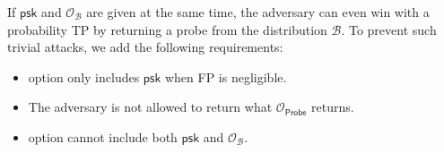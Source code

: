 \noindent If $\textsf{psk}$ and $\mathcal{O}_{\mathcal{B}}$ are given at the same time, the adversary can even win with a probability \textsf{TP} by returning a probe from the distribution $\mathcal{B}$. To prevent such trivial attacks, we add the following requirements:

\begin{itemize}
	\item \textsf{option} only includes $\textsf{psk}$ when \textsf{FP} is negligible.

	\item \label{item:requirement} The adversary is not allowed to return what $\mathcal{O}_\textsf{Probe}$ returns.
	
	\item \textsf{option} cannot include both $\textsf{psk}$ and $\mathcal{O}_{\mathcal{B}}$.
\end{itemize}


 

